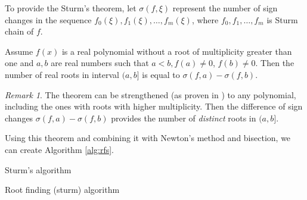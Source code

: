 \documentclass[
  digital, %
  notable,   %
  nolof,     %
  nolot,     %
	final, %
]{fithesis3}
\begin{document}
To provide the Sturm's theorem, let $\sigma(f,\xi)$ represent the number of sign changes in the sequence $f_{0}(\xi), f_{1}(\xi),\ldots,f_{m}(\xi)$, where $f_{0}, f_{1},\ldots,f_{m}$ is Sturm chain of $f$.

\begin{theorem}
Assume $f(x)$ is a real polynomial without a root of multiplicity greater than one and $a, b$ are real numbers such that $a<b, f(a)\neq{0}$, $f(b)\neq{0}$. Then the number of real roots in interval $(a,b]$ is equal to $\sigma(f,a) - \sigma(f,b)$.
\end{theorem}
\theoremstyle{remark}
\newtheorem*{remark}{Remark}
\begin{remark}
  The theorem can be strengthened (as proven in \cite{sturmGeneral}) to any polynomial, including the ones with roots with higher multiplicity. Then the difference of sign changes $\sigma(f,a) - \sigma(f,b)$ provides the number of \textit{distinct} roots in $(a,b]$.
\end{remark}
Using this theorem and combining it with Newton's method and bisection, we can create Algorithm \ref{alg:rfs}.
\begin{algorithm}
  \caption{Sturm's algorithm
    \label{alg:sturm}}
  \begin{algorithmic}[1]
    \Statex
			\EndIf
			\EndIf
			\EndIf
			\EndIf
		\EndWhile
		\State{}
    \EndFunction
  \end{algorithmic}
\end{algorithm}
\begin{algorithm}
  \caption{Root finding (sturm) algorithm
    \label{alg:rfs}}
  \begin{algorithmic}[1]
    \Statex
						\State{}
					\EndIf
				\EndIf
			\EndIf
    \EndFunction
  \end{algorithmic}
\end{algorithm}
\end{document}
